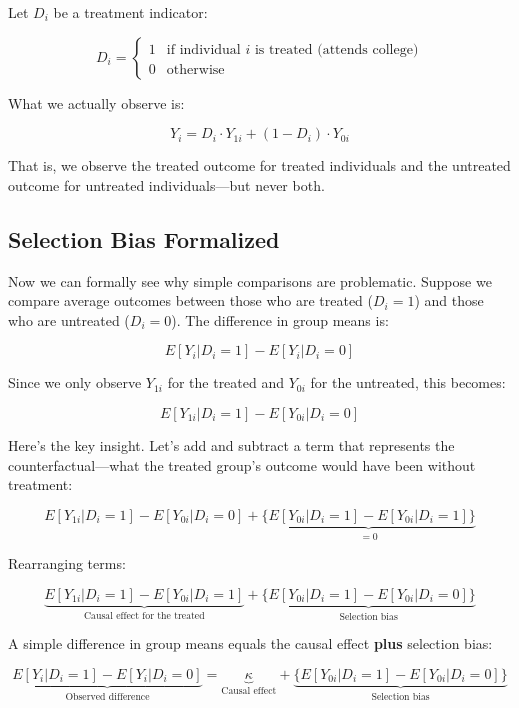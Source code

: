 \documentclass[
  letterpaper,
  DIV=11,
  numbers=noendperiod]{scrreprt}
\begin{document}
Let \(D_i\) be a treatment indicator:

\[
D_i = \begin{cases}
1 & \text{if individual } i \text{ is treated (attends college)} \\
0 & \text{otherwise}
\end{cases}
\]

What we actually observe is:

\[
Y_i = D_i \cdot Y_{1i} + (1 - D_i) \cdot Y_{0i}
\]

That is, we observe the treated outcome for treated individuals and the
untreated outcome for untreated individuals---but never both.

\subsection{Selection Bias Formalized}\label{selection-bias-formalized}

Now we can formally see why simple comparisons are problematic. Suppose
we compare average outcomes between those who are treated (\(D_i = 1\))
and those who are untreated (\(D_i = 0\)). The difference in group means
is:

\[
E[Y_i | D_i = 1] - E[Y_i | D_i = 0]
\]

Since we only observe \(Y_{1i}\) for the treated and \(Y_{0i}\) for the
untreated, this becomes:

\[
E[Y_{1i} | D_i = 1] - E[Y_{0i} | D_i = 0]
\]

Here's the key insight. Let's add and subtract a term that represents
the counterfactual---what the treated group's outcome would have been
without treatment:

\[
E[Y_{1i} | D_i = 1] - E[Y_{0i} | D_i = 0] + \underbrace{\{E[Y_{0i} | D_i = 1] - E[Y_{0i} | D_i = 1]\}}_{= 0}
\]

Rearranging terms:

\[
\underbrace{E[Y_{1i} | D_i = 1] - E[Y_{0i} | D_i = 1]}_{\text{Causal effect for the treated}} + \underbrace{\{E[Y_{0i} | D_i = 1] - E[Y_{0i} | D_i = 0]\}}_{\text{Selection bias}}
\]

\begin{tcolorbox}[enhanced jigsaw, arc=.35mm, bottomrule=.15mm, bottomtitle=1mm, breakable, colback=white, colbacktitle=quarto-callout-important-color!10!white, colframe=quarto-callout-important-color-frame, coltitle=black, left=2mm, leftrule=.75mm, opacityback=0, opacitybacktitle=0.6, rightrule=.15mm, title=\textcolor{quarto-callout-important-color}{\faExclamation}\hspace{0.5em}{The Selection Bias Decomposition}, titlerule=0mm, toprule=.15mm, toptitle=1mm]

A simple difference in group means equals the causal effect
\textbf{plus} selection bias:

\[
\underbrace{E[Y_i | D_i = 1] - E[Y_i | D_i = 0]}_{\text{Observed difference}} = \underbrace{\kappa}_{\text{Causal effect}} + \underbrace{\{E[Y_{0i} | D_i = 1] - E[Y_{0i} | D_i = 0]\}}_{\text{Selection bias}}
\]

\end{tcolorbox}
\end{document}
